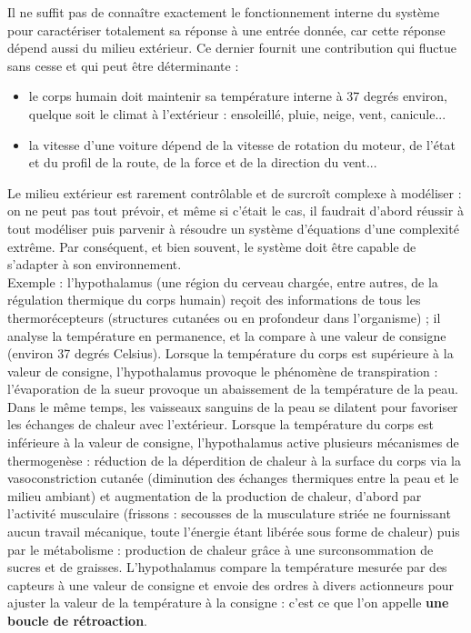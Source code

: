 \documentclass[11pt,a4paper]{report}
\begin{document}
Il ne suffit pas de connaître exactement le fonctionnement interne du système pour caractériser totalement sa réponse à une entrée donnée, car cette réponse dépend aussi du milieu extérieur. Ce dernier fournit une contribution qui fluctue sans cesse et qui peut être déterminante :
\begin{itemize}
	\item le corps humain doit maintenir sa température interne à 37 degrés environ, quelque soit le climat à l'extérieur : ensoleillé, pluie, neige, vent, canicule...
	\item la vitesse d'une voiture dépend de la vitesse de rotation du moteur, de l'état et du profil de la route, de la force et de la direction du vent...
\end{itemize}
Le milieu extérieur est rarement contrôlable et de surcroît complexe à modéliser : on ne peut pas tout prévoir, et même si c'était le cas, il faudrait d'abord réussir à tout modéliser puis parvenir à résoudre un système d'équations d'une complexité extrême. Par conséquent, et bien souvent, le système doit être capable de s'adapter à son environnement.\\

Exemple : l'hypothalamus (une région du cerveau chargée, entre autres, de la régulation thermique du corps humain) reçoit des informations de tous les thermorécepteurs (structures cutanées ou en profondeur dans l'organisme) ; il analyse la température en permanence, et la compare à une valeur de consigne (environ 37 degrés Celsius). Lorsque la température du corps est supérieure à la valeur de consigne, l'hypothalamus provoque le phénomène de transpiration : l'évaporation de la sueur provoque un abaissement de la température de la peau. Dans le même temps, les vaisseaux sanguins de la peau se dilatent pour favoriser les échanges de chaleur avec l'extérieur. Lorsque la température du corps est inférieure à la valeur de consigne, l'hypothalamus active plusieurs mécanismes de thermogenèse : réduction de la déperdition de chaleur à la surface du corps via la vasoconstriction cutanée (diminution des échanges thermiques entre la peau et le milieu ambiant) et augmentation de la production de chaleur, d'abord par l'activité musculaire (frissons : secousses de la musculature striée ne fournissant aucun travail mécanique, toute l'énergie étant libérée sous forme de chaleur) puis par le métabolisme : production de chaleur grâce à une surconsommation de sucres et de graisses. L'hypothalamus compare la température mesurée par des capteurs à une valeur de consigne et envoie des ordres à divers actionneurs pour ajuster la valeur de la température à la consigne : c'est ce que l'on appelle \textbf{une boucle de rétroaction}.\\
	
\end{document}
